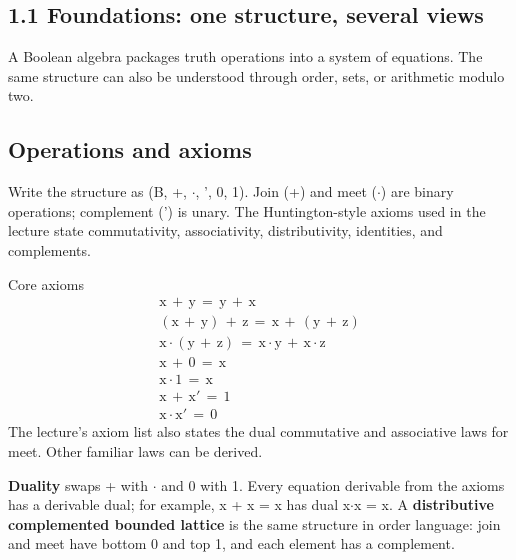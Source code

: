 \documentclass[11pt]{article}
\begin{document}
\begin{keepsection}
\section{1.1 Foundations: one structure, several views}

A Boolean algebra packages truth operations into a system of equations. The same structure can also be understood through order, sets, or arithmetic modulo two.

\begin{keepsection}
\subsection{Operations and axioms}

Write the structure as (B, +, \ensuremath{\cdot}, ', 0, 1). Join (+) and meet (\ensuremath{\cdot}) are binary operations; complement (') is unary. The Huntington-style axioms used in the lecture state commutativity, associativity, distributivity, identities, and complements.

\begin{equationcard}{Core axioms}
\[ \begin{gathered} \mathrm{x}\, +\, \mathrm{y}\, =\, \mathrm{y}\, +\, \mathrm{x} \\ (\mathrm{x}\, +\, \mathrm{y})\, +\, \mathrm{z}\, =\, \mathrm{x}\, +\, (\mathrm{y}\, +\, \mathrm{z}) \\ \mathrm{x}\cdot (\mathrm{y}\, +\, \mathrm{z})\, =\, \mathrm{x}\cdot \mathrm{y}\, +\, \mathrm{x}\cdot \mathrm{z} \\ \mathrm{x}\, +\, 0\, =\, \mathrm{x} \\ \mathrm{x}\cdot 1\, =\, \mathrm{x} \\ \mathrm{x}\, +\, \mathrm{x}'\, =\, 1 \\ \mathrm{x}\cdot \mathrm{x}'\, =\, 0 \end{gathered} \]
{\small The lecture’s axiom list also states the dual commutative and associative laws for meet. Other familiar laws can be derived.}
\end{equationcard}

\textbf{Duality} swaps + with \ensuremath{\cdot} and 0 with 1. Every equation derivable from the axioms has a derivable dual; for example, x + x = x has dual x\ensuremath{\cdot}x = x. A \textbf{distributive complemented bounded lattice} is the same structure in order language: join and meet have bottom 0 and top 1, and each element has a complement.


\end{keepsection}
\end{keepsection}
\end{document}
